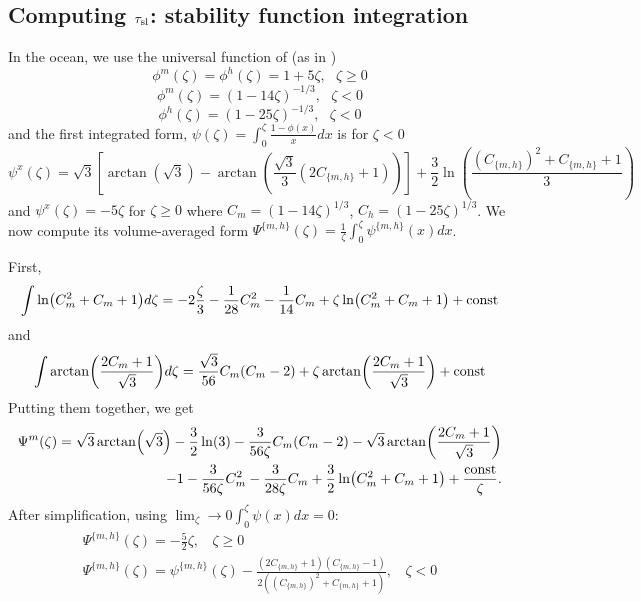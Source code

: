 \subsection{Computing $\tau_{\rm sl}$: stability function integration}
In the ocean, we use the universal function of \citep{large2019similarity} (as in \citep{pelletier2021two})
\begin{equation}
	\phi^m(\zeta) = \phi^h(\zeta) = 1+5\zeta, ~~~ \zeta \geq 0
\end{equation}
\begin{equation}
	\phi^m(\zeta) = (1-14\zeta)^{-1/3}, ~~~ \zeta < 0
\end{equation}
\begin{equation}
	\phi^h(\zeta) = (1-25\zeta)^{-1/3}, ~~~ \zeta < 0
\end{equation}
and the first integrated form, $\psi(\zeta)= \int_0^\zeta \frac{1-\phi(x)}{x}dx$ is for $\zeta<0$
\begin{equation}
	\psi^x(\zeta)  = \sqrt{3}\left[\arctan(\sqrt{3}) -
	\arctan\left(\frac{\sqrt{3}}{3}(2C_{\{m,h\}}+1)\right)\right]
	+ \frac{3}{2}\ln \left(\frac{(C_{\{m,h\}})^2 + C_{\{m,h\}} + 1}{3}\right)
\end{equation}
and $\psi^x(\zeta) = -5\zeta$ for $\zeta \geq 0$
where $C_m = (1-14\zeta)^{1/3}$, $C_h = (1-25\zeta)^{1/3}$.
We now compute its volume-averaged form $\Psi^{\{m,h\}}(\zeta)= \frac{1}{\zeta}\int_0^\zeta \psi^{\{m,h\}}(x)dx$.
\par
First,
\begin{equation}
	\int \ln (C_m^2+C_m+1)d\zeta
	= -2 \frac{\zeta}{3} - \frac{1}{28}C_m^2 - \frac{1}{14}C_m
	+\zeta\ln (C_m^2+C_m+1) + {\rm const}
\end{equation}
and
\begin{equation}
	\int \arctan (\frac{2C_m+1}{\sqrt{3}})d\zeta
	= \frac{\sqrt{3}}{56}C_m(C_m-2)
	+ \zeta \arctan (\frac{2C_m+1}{\sqrt{3}}) + {\rm const}
\end{equation}
Putting them together, we get
\begin{equation}
\begin{aligned}
	\Psi^m(\zeta)=\sqrt{3}\arctan(\sqrt{3})- 
	\frac{3}{2}\ln(3) -
	\frac{3}{56\zeta}C_m(C_m-2)
	- \sqrt{3} \arctan (\frac{2C_m+1}{\sqrt{3}})
	\\
	-1 - \frac{3}{56\zeta}C_m^2 - \frac{3}{28\zeta}C_m
	+\frac{3}{2}\ln (C_m^2+C_m+1)
	+ \frac{{\rm const}}{\zeta}.
\end{aligned}
\end{equation}
After simplification, using $\lim_\zeta\to0 \int_0^\zeta\psi(x)dx = 0$:
\begin{equation}
\begin{aligned}
\Psi^{\{m,h\}}(\zeta)= -\frac{5}{2}\zeta, ~~~~ \zeta \geq 0 \\
	\Psi^{\{m,h\}}(\zeta)=
	\psi^{\{m,h\}}(\zeta)
	- \frac{(2C_{\{m,h\}}+1)(C_{\{m,h\}} - 1)}
	{2\left((C_{\{m,h\}})^2 + C_{\{m,h\}} + 1\right)}, ~~~~ \zeta < 0
\end{aligned}
\end{equation}
